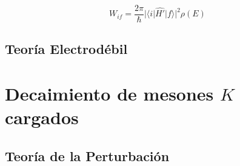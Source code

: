 \begin{equation}
W_{if}= \dfrac{2\pi }{\hbar }\left| \langle i\right| \widehat{H'}| f\rangle| ^{2}\rho \left( E\right)
\end{equation}

\subsection{Teoría Electrodébil}\label{sec:electroweak}

\section{Decaimiento de mesones $K$ cargados}
\label{sec:charged_kaon_decay}

\subsection{Teoría de la Perturbación}\label{sec:perturbation_theory}